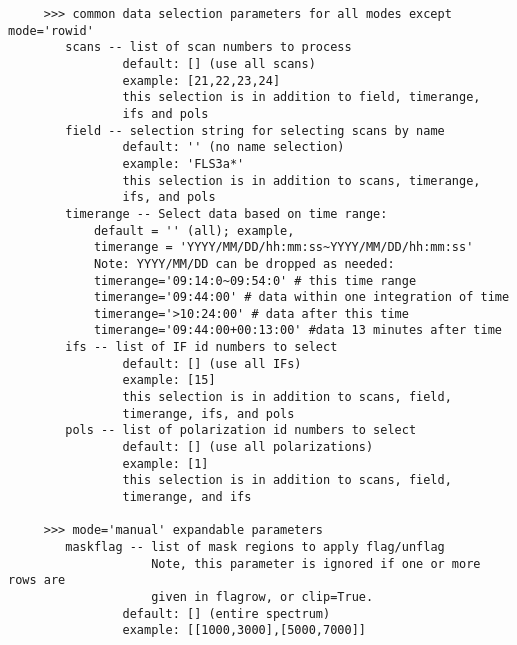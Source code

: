 \begin{verbatim}
     >>> common data selection parameters for all modes except mode='rowid'
        scans -- list of scan numbers to process
                default: [] (use all scans)
                example: [21,22,23,24]
                this selection is in addition to field, timerange,
                ifs and pols
        field -- selection string for selecting scans by name
                default: '' (no name selection)
                example: 'FLS3a*'
                this selection is in addition to scans, timerange,
                ifs, and pols
        timerange -- Select data based on time range:
            default = '' (all); example,
            timerange = 'YYYY/MM/DD/hh:mm:ss~YYYY/MM/DD/hh:mm:ss'
            Note: YYYY/MM/DD can be dropped as needed:
            timerange='09:14:0~09:54:0' # this time range
            timerange='09:44:00' # data within one integration of time
            timerange='>10:24:00' # data after this time
            timerange='09:44:00+00:13:00' #data 13 minutes after time
        ifs -- list of IF id numbers to select
                default: [] (use all IFs)
                example: [15]
                this selection is in addition to scans, field,
                timerange, ifs, and pols
        pols -- list of polarization id numbers to select
                default: [] (use all polarizations)
                example: [1]
                this selection is in addition to scans, field,
                timerange, and ifs

     >>> mode='manual' expandable parameters
        maskflag -- list of mask regions to apply flag/unflag 
                    Note, this parameter is ignored if one or more rows are 
                    given in flagrow, or clip=True.
                default: [] (entire spectrum)
                example: [[1000,3000],[5000,7000]]


\end{verbatim}
